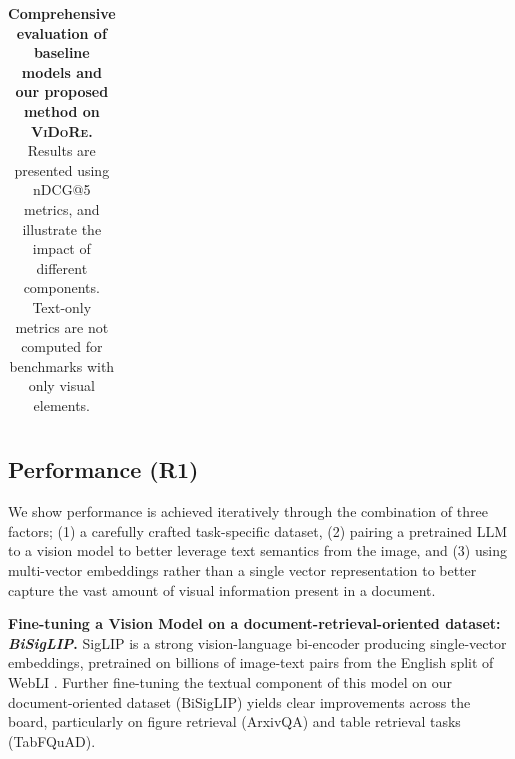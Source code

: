\begin{table}[ht]
{\begin{tabular}{ll@{\hskip 0.5em}l@{\hskip 0.5em}l@{\hskip 0.5em}l@{\hskip 0.5em}l@{\hskip 0.5em}l@{\hskip 0.5em}l@{\hskip 0.5em}l@{\hskip 0.5em}l@{\hskip 0.5em}l|@{\hskip 0.5em}l}
\bottomrule

\end{tabular}}


    \caption[Baseline and \textsc{ViDoRe} evaluation]{\textbf{Comprehensive evaluation of baseline models and our proposed method on \textsc{ViDoRe}.} Results are presented using nDCG@5 metrics, and illustrate the impact of different components. Text-only metrics are not computed for benchmarks with only visual elements.} 
    \label{table:colpali:results}
\end{table}



\subsection{Performance (R1)}
\label{subsection:performance}


We show performance is achieved iteratively through the combination of three factors; (1) a carefully crafted task-specific dataset, (2) pairing a pretrained LLM to a vision model to better leverage text semantics from the image, and (3) using multi-vector embeddings rather than a single vector representation to better capture the vast amount of visual information present in a document.
 
\noindent\textbf{Fine-tuning a Vision Model on a document-retrieval-oriented dataset: \textit{BiSigLIP}.} SigLIP is a strong vision-language bi-encoder producing single-vector embeddings, pretrained on billions of image-text pairs from the English split of WebLI . Further fine-tuning the textual component of this model on our document-oriented dataset (BiSigLIP) yields clear improvements across the board, particularly on figure retrieval (ArxivQA) and table retrieval tasks (TabFQuAD).


